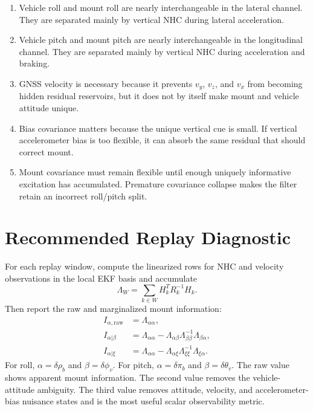 \documentclass[11pt]{article}
\newcommand{\T}{^{T}}
\newcommand{\phiv}{\delta\phi_v}
\newcommand{\rhom}{\delta\rho_b}
\newcommand{\thetav}{\delta\theta_v}
\newcommand{\pim}{\delta\pi_b}
\begin{document}
\begin{enumerate}[leftmargin=*]
  \item Vehicle roll and mount roll are nearly interchangeable in the lateral
        channel. They are separated mainly by vertical NHC during lateral
        acceleration.
  \item Vehicle pitch and mount pitch are nearly interchangeable in the
        longitudinal channel. They are separated mainly by vertical NHC during
        acceleration and braking.
  \item GNSS velocity is necessary because it prevents \(v_y\), \(v_z\), and
        \(v_x\) from becoming hidden residual reservoirs, but it does not by
        itself make mount and vehicle attitude unique.
  \item Bias covariance matters because the unique vertical cue is small. If
        vertical accelerometer bias is too flexible, it can absorb the same
        residual that should correct mount.
  \item Mount covariance must remain flexible until enough uniquely informative
        excitation has accumulated. Premature covariance collapse makes the
        filter retain an incorrect roll/pitch split.
\end{enumerate}

\section{Recommended Replay Diagnostic}

For each replay window, compute the linearized rows for NHC and velocity
observations in the local EKF basis and accumulate
\begin{equation}
  \Lambda_W=\sum_{k\in W} H_k\T R_k^{-1}H_k .
\end{equation}
Then report the raw and marginalized mount information:
\begin{align}
  I_{\alpha,\text{raw}} &= \Lambda_{\alpha\alpha},\\
  I_{\alpha|\beta} &=
    \Lambda_{\alpha\alpha}
    -\Lambda_{\alpha\beta}\Lambda_{\beta\beta}^{-1}\Lambda_{\beta\alpha},\\
  I_{\alpha|\xi} &=
    \Lambda_{\alpha\alpha}
    -\Lambda_{\alpha\xi}\Lambda_{\xi\xi}^{-1}\Lambda_{\xi\alpha}.
\end{align}
For roll, \(\alpha=\rhom\) and \(\beta=\phiv\). For pitch,
\(\alpha=\pim\) and \(\beta=\thetav\). The raw value shows apparent mount
information. The second value removes the vehicle-attitude ambiguity. The
third value removes attitude, velocity, and accelerometer-bias nuisance states
and is the most useful scalar observability metric.
\end{document}
